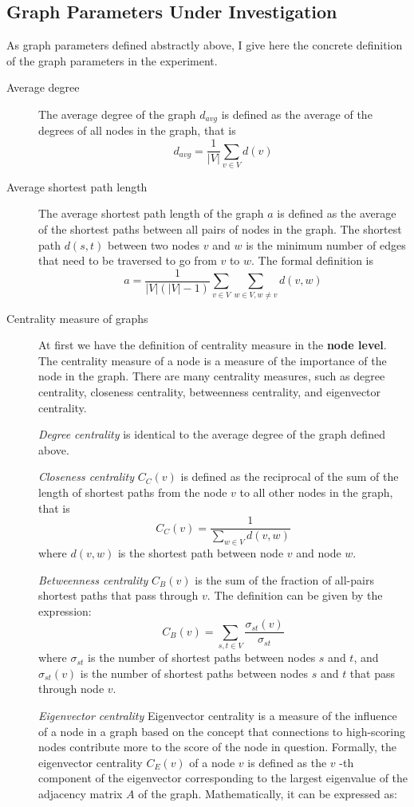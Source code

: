 \documentclass{article}
\begin{document}
\subsection{Graph Parameters Under Investigation} \label{sec:graph_parameters}
As graph parameters defined abstractly above, I give here the concrete definition of the graph parameters in the experiment.\\
\begin{description}
    \item [Average degree] The average degree of the graph $d_{avg}$ is defined as the average of the degrees of all nodes in the graph, that is
    $$ d_{avg} = \frac{1}{|V|} \sum_{v \in V} d(v)$$
    \item [Average shortest path length] The average shortest path length of the graph $a$ is defined as the average of the shortest paths between all pairs of nodes in the graph. The shortest path $d(s, t)$ between two nodes $v$ and $w$ is the minimum number of edges that need to be traversed to go from $v$ to $w$. The formal definition is
    $$
a = \frac{1}{|V|(|V|-1)} \sum_{v \in V} \sum_{w \in V, w \neq v} d(v, w)
    $$
    \item [Centrality measure of graphs] At first we have the definition of centrality measure in the \textbf{node level}. The centrality measure of a node is a measure of the importance of the node in the graph. There are many centrality measures, such as degree centrality, closeness centrality, betweenness centrality, and eigenvector centrality. 
    
    \textit{Degree centrality} is identical to the average degree of the graph defined above. 
    
    \textit{Closeness centrality} $C_C(v)$ is defined as the reciprocal of the sum of the length of shortest paths from the node $v$ to all other nodes in the graph, that is 
    $$C_C(v) = \frac{1}{\sum_{w\in V}{d(v ,w)}}$$
    where $d(v, w)$ is the shortest path between node $v$ and node $w$. 
    
    \textit{Betweenness centrality} $C_B(v)$ is the sum of the fraction of all-pairs shortest paths that pass through $v$. The definition can be given by the expression:
    $$
        C_B(v) = \sum_{s,t \in V} \frac{\sigma_{st}(v)}{\sigma_{st}}
    $$
    where $\sigma_{st}$ is the number of shortest paths between nodes $s$ and $t$, and $\sigma_{st}(v)$ is the number of shortest paths between nodes $s$ and $t$ that pass through node $v$.
    
    \textit{Eigenvector centrality} Eigenvector centrality is a measure of the influence of a node in a graph based on the concept that connections to high-scoring nodes contribute more to the score of the node in question. Formally, the eigenvector centrality $C_E(v)$ of a node $v$  is defined as the $v$ -th component of the eigenvector corresponding to the largest eigenvalue of the adjacency matrix $A$ of the graph. Mathematically, it can be expressed as:
    

\end{description}
\end{document}
